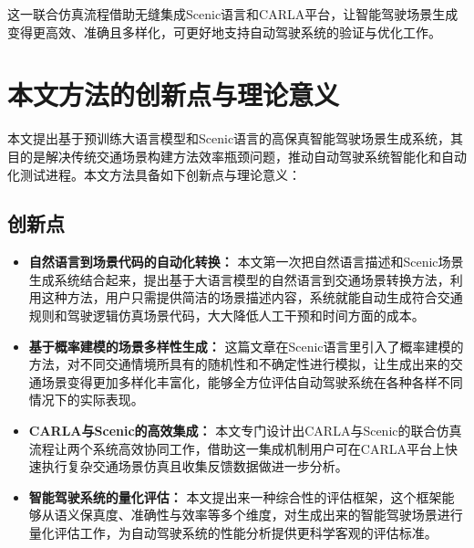这一联合仿真流程借助无缝集成Scenic语言和CARLA平台，让智能驾驶场景生成变得更高效、准确且多样化，可更好地支持自动驾驶系统的验证与优化工作。

\section{本文方法的创新点与理论意义}

本文提出基于预训练大语言模型和Scenic语言的高保真智能驾驶场景生成系统，其目的是解决传统交通场景构建方法效率瓶颈问题，推动自动驾驶系统智能化和自动化测试进程。本文方法具备如下创新点与理论意义：

\subsection{创新点}

\begin{itemize}
	\item \textbf{自然语言到场景代码的自动化转换：} 本文第一次把自然语言描述和Scenic场景生成系统结合起来，提出基于大语言模型的自然语言到交通场景转换方法，利用这种方法，用户只需提供简洁的场景描述内容，系统就能自动生成符合交通规则和驾驶逻辑仿真场景代码，大大降低人工干预和时间方面的成本。
	
	\item \textbf{基于概率建模的场景多样性生成：} 这篇文章在Scenic语言里引入了概率建模的方法，对不同交通情境所具有的随机性和不确定性进行模拟，让生成出来的交通场景变得更加多样化丰富化，能够全方位评估自动驾驶系统在各种各样不同情况下的实际表现。
	
	\item \textbf{CARLA与Scenic的高效集成：} 本文专门设计出CARLA与Scenic的联合仿真流程让两个系统高效协同工作，借助这一集成机制用户可在CARLA平台上快速执行复杂交通场景仿真且收集反馈数据做进一步分析。
	
	\item \textbf{智能驾驶系统的量化评估：} 本文提出来一种综合性的评估框架，这个框架能够从语义保真度、准确性与效率等多个维度，对生成出来的智能驾驶场景进行量化评估工作，为自动驾驶系统的性能分析提供更科学客观的评估标准。
\end{itemize}
